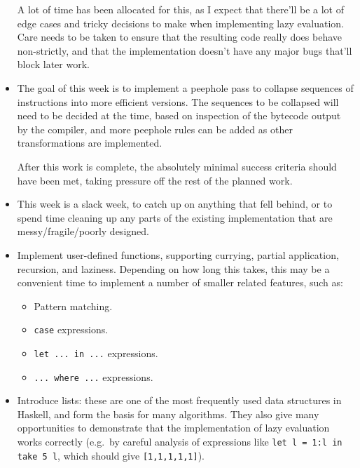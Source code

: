 \documentclass[12pt]{article}
\newcommand\haskell[1]{\texttt{#1}}
\begin{document}
\begin{itemize}
{    A lot of time has been allocated for this, as I expect that there'll be a lot of edge cases and tricky decisions to
    make when implementing lazy evaluation. Care needs to be taken to ensure that the resulting code really does behave
    non-strictly, and that the implementation doesn't have any major bugs that'll block later work.
}
\item
{

    The goal of this week is to implement a peephole pass to collapse sequences of instructions into more efficient
    versions. The sequences to be collapsed will need to be decided at the time, based on inspection of the bytecode
    output by the compiler, and more peephole rules can be added as other transformations are implemented.
    
    After this work is complete, the absolutely minimal success criteria should have been met, taking pressure off the
    rest of the planned work.
}
\item
{

    This week is a slack week, to catch up on anything that fell behind, or to spend time cleaning up any parts of the
    existing implementation that are messy/fragile/poorly designed.
}
\item
{

    Implement user-defined functions, supporting currying, partial application, recursion, and laziness. Depending on
    how long this takes, this may be a convenient time to implement a number of smaller related features, such as:
    
    \begin{itemize}
    \item Pattern matching.
    \item \haskell{case} expressions.
    \item \haskell{let ... in ...} expressions.
    \item \haskell{... where ...} expressions.
    \end{itemize}
}
\item
{

    Introduce lists: these are one of the most frequently used data structures in Haskell, and form the basis for many
    algorithms. They also give many opportunities to demonstrate that the implementation of lazy evaluation works
    correctly (e.g.\ by careful analysis of expressions like \haskell{let l = 1:l in take 5 l}, which should give
    \haskell{[1,1,1,1,1]}).

}
\end{itemize}
\end{document}
